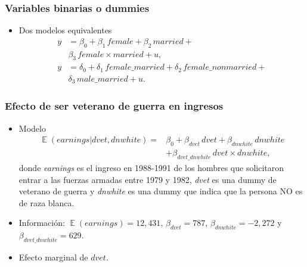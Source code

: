 \documentclass[t, compress, spanish, aspectratio=169]{beamer}
\DeclareMathOperator{\E}{\mathbb{E}}
\begin{document}
    \begin{frame}
        \frametitle{Variables binarias o dummies}
        \begin{itemize}
            \item Dos modelos equivalentes
            \begin{align}
            y&=\beta_0 + \beta_1 \, female + \beta_2\, married + \nonumber \\
            &\beta_3\, female \times married+u,\\
            y&=\delta_0 + \delta_1 \, female\_married + \delta_2\, female\_nonmarried + \nonumber \\
            &\delta_3\, male\_married+u.
            \end{align}
        \end{itemize}
    \end{frame}
    
    \begin{frame}
    		\frametitle{Efecto de ser veterano de guerra en ingresos}
    		\begin{itemize}
    			\item Modelo
    			\begin{align*}
    				\E(earnings|dvet, dnwhite) =& \beta_0 +\beta_{dvet} \,dvet +\beta_{dnwhite} \,dnwhite\\
    				&+\beta_{dvet\_dnwhite} \,dvet \times dnwhite,
    			\end{align*}
    			donde \emph{earnings} es el ingreso en 1988-1991 de los hombres que solicitaron entrar a las fuerzas armadas entre 1979 y 1982, \emph{dvet} es una dummy de veterano de guerra y \emph{dnwhite} es una dummy que indica que la persona NO es de raza blanca.
    			\item Informaci\'on: $\E(earnings)=12{,}431$, $\beta_{dvet}=787$, $\beta_{dnwhite}=-2{,}272$ y $\beta_{dvet\_dnwhite}=629$.
    			\item Efecto marginal de $dvet$.
    		\end{itemize}
    \end{frame}
%    
    
\end{document}
